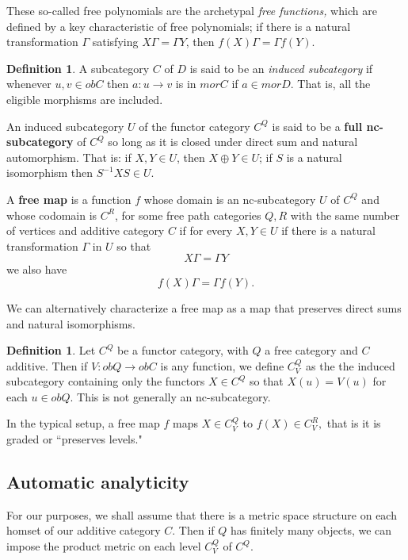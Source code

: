 \documentclass[12pt]{amsart}
\theoremstyle{definition}
\newtheorem{definition}[theorem]{Definition}
\numberwithin{equation}{section}
\begin{document}
These so-called free polynomials are the archetypal \textit{free functions,} which are defined by a key characteristic of free polynomials; if there is a natural transformation $\Gamma$ satisfying $X \Gamma = \Gamma Y$, then $f(X)\Gamma = \Gamma f(Y).$ 

\begin{definition}
    A subcategory $C$ of $D$ is said to be an \textit{induced subcategory} if whenever $u, v \in ob C$ then $a: u\rightarrow v$ is in $mor C$ if $a\in morD$. That is, all the eligible morphisms are included. 

    An induced subcategory $U$ of the functor category $C^Q$ is said to be a \textbf{full nc-subcategory} of $C^Q$ so long as it is closed under direct sum and natural automorphism. 
    That is: if $X, Y \in U$, then $X\oplus Y \in U$; if $S$ is a natural isomorphism then $S^{-1}XS \in U$. 

    A \textbf{free map} is a function $f$ whose domain is an nc-subcategory $U$ of $C^Q$ and whose codomain is $C^R$, for some free path categories $Q, R$ with the same number of vertices and additive category $C$ if for every $X, Y \in U$ if there is a natural transformation $\Gamma$ in $U$ so that \[X\Gamma = \Gamma Y\] we also have \[f(X)\Gamma = \Gamma f(Y). \]
\end{definition}

We can alternatively characterize a free map as a map that preserves direct sums and natural isomorphisms. 

\begin{definition}
    Let $C^Q$ be a functor category, with $Q$ a free category and $C$ additive. Then if $V: ob Q \rightarrow ob C$ is any function, we define $C^Q_V$ as the the induced subcategory containing only the functors $X \in C^Q$ so that $X(u) = V(u)$ for each $u \in ob Q$. This is not generally an nc-subcategory. 

    In the typical setup, a free map $f$ maps $X \in C^Q_V$ to $f(X) \in C^R_V,$ that is it is graded or ``preserves levels." 
\end{definition}

\subsection{Automatic analyticity}

For our purposes, we shall assume that there is a metric space structure on each homset of our additive category $C$. Then if $Q$ has finitely many objects, we can impose the product metric on each level $C^Q_V$ of $C^Q$.
\end{document}
